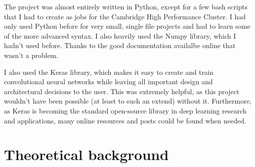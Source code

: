 \documentclass[12pt,a4paper,twoside,openright]{report}
\begin{document}
The project was almost entirely written in Python, except for a few bash scripts that I had to create as jobs for the Cambridge High Performance Cluster. I had only used Python before for very small, single file projects and had to learn some of the more advanced syntax. I also heavily used the Numpy library, which I hadn't used before. Thanks to the good documentation availalbe online that wasn't a problem.

I also used the Keras library, which makes it easy to create and train convolutional neural networks while leaving all important design and architectural decisions to the user. This was extremely helpful, as this project wouldn't have been possible (at least to such an extend) without it. Furthermore, as Keras is becoming the standard open-source library in deep learning research and applications, many online resources and posts could be found when needed.

\section{Theoretical background}
\end{document}
